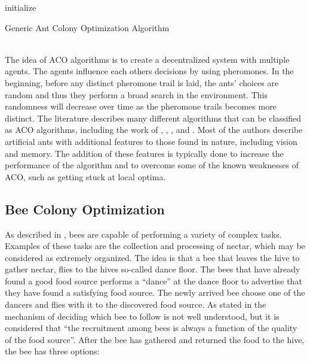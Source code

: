 \begin{algorithm}[H]
 initialize\;
 \caption{Generic Ant Colony Optimization Algorithm}
\end{algorithm}
~\\
The idea of ACO algorithms is to create a decentralized system with multiple agents. The agents influence each others decisions by using pheromones. In the beginning, before any distinct pheromone trail is laid, the ants' choices are random and thus they perform a broad search in the environment. This randomness will decrease over time as the pheromone trails becomes more distinct. The literature describes many different algorithms that can be classified as ACO algorithms, including the work of \citet{salehi-nezhad07}, \citet{tripathi09}, \citet{jiang10}, and \citet{dias14}. Most of the authors describe artificial ants with additional features to those found in nature, including vision and memory. The addition of these features is typically done to increase the performance of the algorithm and to overcome some of the known weaknesses of ACO, such as getting stuck at local optima.  


\subsection{Bee Colony Optimization}
As described in \citet{lucic03}, bees are capable of performing a variety of complex tasks. Examples of these tasks are the collection and processing of nectar, which may be considered as extremely organized. The idea is that a bee that leaves the hive to gather nectar, flies to the hives so-called dance floor. The bees that have already found a good food source performs a ``dance'' at the dance floor to advertise that they have found a satisfying food source. The newly arrived bee choose one of the dancers and flies with it to the discovered food source. As stated in \citet{lucic03} the mechanism of deciding which bee to follow is not well understood, but it is considered that ``the recruitment among bees is always a function of the quality of the food source''. After the bee has gathered and returned the food to the hive, the bee has three options\citep{lucic03}:

